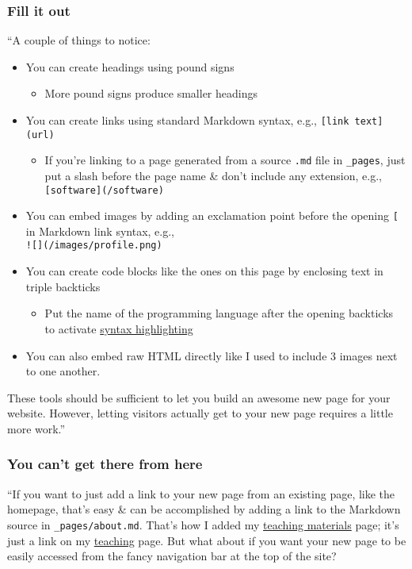 \documentclass{article}
\numberwithin{equation}{section}
\begin{document}
\subsubsection{Fill it out}
``A couple of things to notice:
\begin{itemize}
	\item You can create headings using pound signs
	\begin{itemize}
		\item More pound signs produce smaller headings
	\end{itemize}
	\item You can create links using standard Markdown syntax, e.g., \texttt{[link text] (url)}
	\begin{itemize}
		\item If you're linking to a page generated from a source \texttt{.md} file in \verb|_pages|, just put a slash before the page name \& don't include any extension, e.g., \texttt{[software](/software)}
	\end{itemize}
	\item You can embed images by adding an exclamation point before the opening \texttt{[} in Markdown link syntax, e.g.,\\\texttt{![](/images/profile.png)}
	\item You can create code blocks like the ones on this page by enclosing text in triple backticks
	\begin{itemize}
		\item Put the name of the programming language after the opening backticks to activate \href{https://en.wikipedia.org/wiki/Syntax_highlighting}{syntax highlighting}
	\end{itemize}
	\item You can also embed raw HTML directly like I used to include 3 images next to one another.
\end{itemize}
These tools should be sufficient to let you build an awesome new page for your website. However, letting visitors actually get to your new page requires a little more work.''

\subsubsection{You can't get there from here}
``If you want to just add a link to your new page from an existing page, like the homepage, that's easy \& can be accomplished by adding a link to the Markdown source in \verb|_pages/about.md|. That's how I added my \href{https://jayrobwilliams.com/teaching-materials/}{teaching materials} page; it's just a link on my \href{https://jayrobwilliams.com/teaching}{teaching} page. But what about if you want your new page to be easily accessed from the fancy navigation bar at the top of the site?
\end{document}
